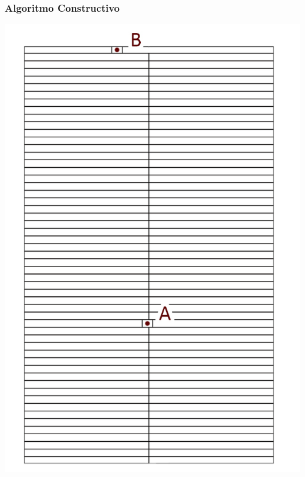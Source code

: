 \begin{frame}
    \frametitle{Algoritmo Constructivo}
    \endblock{}
		\begin{center}
    \includegraphics[height=0.8\textheight]{FIGURES/paso3}
		\end{center}
\end{frame}

